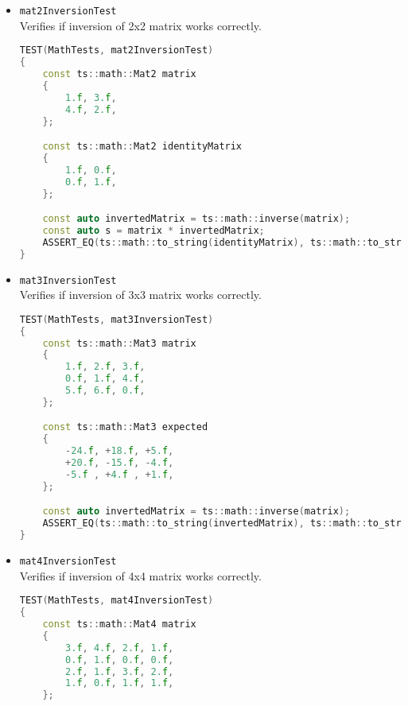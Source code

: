 \begin{itemize}
\begin{itemize}
\begin{lstlisting}[language=c++, caption=\texttt{mat3MultiplicationTest} test (./engine/tests/tester.cpp)]
    const ts::math::Mat3 rightMatrix
    {
        0.11f, 0.12f, 0.13f,
        0.14f, 0.15f, 0.16f,
        0.17f, 0.18f, 0.19f,
    };

    const ts::math::Mat3 expected
    {
        0.216f, 0.231f, 0.246f,
        0.342f, 0.366f, 0.39f ,
        0.09f , 0.096f, 0.102f,
    };

    const auto multiplication = rightMatrix * leftMatrix;
    ASSERT_EQ(ts::math::to_string(expected), ts::math::to_string(multiplication));
}
\end{lstlisting}
            \item \texttt{mat2InversionTest}\\ Verifies if inversion of 2x2 matrix works correctly.
\begin{lstlisting}[language=c++, caption=\texttt{mat2InversionTest} test (./engine/tests/tester.cpp)]
TEST(MathTests, mat2InversionTest)
{
    const ts::math::Mat2 matrix
    {
        1.f, 3.f,
        4.f, 2.f,
    };

    const ts::math::Mat2 identityMatrix
    {
        1.f, 0.f,
        0.f, 1.f,
    };

    const auto invertedMatrix = ts::math::inverse(matrix);
    const auto s = matrix * invertedMatrix;
    ASSERT_EQ(ts::math::to_string(identityMatrix), ts::math::to_string(s));
}
\end{lstlisting}
            \item \texttt{mat3InversionTest}\\ Verifies if inversion of 3x3 matrix works correctly.
\begin{lstlisting}[language=c++, caption=\texttt{mat3InversionTest} test (./engine/tests/tester.cpp)]
TEST(MathTests, mat3InversionTest)
{
    const ts::math::Mat3 matrix
    {
        1.f, 2.f, 3.f,
        0.f, 1.f, 4.f,
        5.f, 6.f, 0.f,
    };

    const ts::math::Mat3 expected
    {
        -24.f, +18.f, +5.f,
        +20.f, -15.f, -4.f,
        -5.f , +4.f , +1.f,
    };

    const auto invertedMatrix = ts::math::inverse(matrix);
    ASSERT_EQ(ts::math::to_string(invertedMatrix), ts::math::to_string(expected));
}
\end{lstlisting}
            \item \texttt{mat4InversionTest}\\ Verifies if inversion of 4x4 matrix works correctly.
\begin{lstlisting}[language=c++, caption=\texttt{mat4InversionTest} test (./engine/tests/tester.cpp)]
TEST(MathTests, mat4InversionTest)
{
    const ts::math::Mat4 matrix
    {
        3.f, 4.f, 2.f, 1.f,
        0.f, 1.f, 0.f, 0.f,
        2.f, 1.f, 3.f, 2.f,
        1.f, 0.f, 1.f, 1.f,
    };


\end{lstlisting}
\end{itemize}
\end{itemize}

